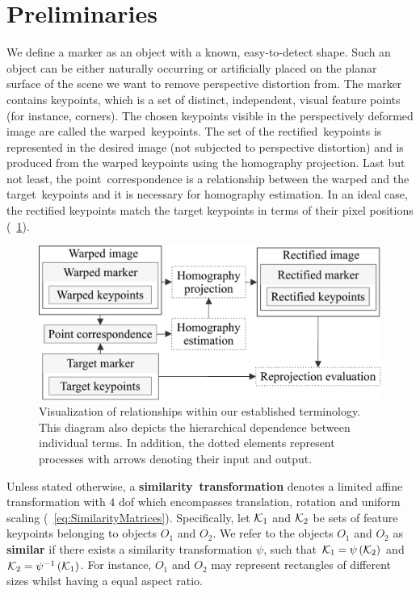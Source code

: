 \section{Preliminaries}
\label{sec:HomographyPreliminaries}

We define a marker as an object with a known, easy-to-detect shape. Such an object can be either naturally occurring or artificially placed on the planar surface of the scene we want to remove perspective distortion from. The marker contains keypoints, which is a set of distinct, independent, visual feature points (for instance, corners). The chosen keypoints visible in the perspectively deformed image are called the \mbox{warped keypoints}. The set of the \mbox{rectified keypoints} is represented in the desired image (not subjected to perspective distortion) and is produced from the warped keypoints using the homography projection. Last but not least, the \mbox{point correspondence} is a relationship between the warped and the \mbox{target keypoints} and it is necessary for homography estimation. In an ideal case, the rectified keypoints match the target keypoints in terms of their pixel positions (\figtext{}~\ref{fig:HomographyTerminology}).

\begin{figure}[t]
    \centering
    \includegraphics[width=0.6\linewidth]{figures/homography/terminology.pdf}
    \caption[Homography ranking terminology]{Visualization of relationships within our established terminology. This diagram also depicts the hierarchical dependence between individual terms. In addition, the dotted elements represent processes with arrows denoting their input and output.}
    \label{fig:HomographyTerminology}
\end{figure}

Unless stated otherwise, a \mbox{\textbf{similarity transformation}} denotes a limited affine transformation with $4$ \gls{dof} which encompasses translation, rotation and uniform scaling (\eqtext{}~\ref{eq:SimilarityMatrices}). Specifically, let $\mathcal{K}_1$ and $\mathcal{K}_2$ be sets of feature keypoints belonging to objects $O_1$ and $O_2$. We refer to the objects $O_1$ and $O_2$ as \mbox{\textbf{similar}} if there exists a similarity transformation $\psi$, such that $\mathcal{K}_1 = {\psi} \left( \mathcal{K}_2 \right)$ and $\mathcal{K}_2 = {\psi^{-1}} \left( \mathcal{K}_1 \right)$. For instance, $O_1$ and $O_2$ may represent rectangles of different sizes whilst having a equal aspect ratio.

